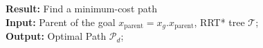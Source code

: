 \documentclass[conference]{IEEEtran}
\begin{document}
\vspace{1ex}
\noindent\textbf{Result:} Find a minimum-cost path \\
\textbf{Input:} Parent of the goal $x_{\text{parent}} = x_g.x_{\text{parent}}$, RRT* tree $\mathcal{T}$; \\
\textbf{Output:} Optimal Path $\mathcal{P}_d$;

\begin{algorithm}[H]
\end{algorithm}
\end{document}
